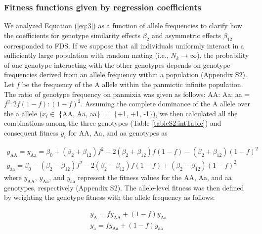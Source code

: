 \documentclass[12pt,]{article}
\begin{document}
\subsubsection{Fitness functions given by regression coefficients}
We analyzed Equation (\ref{eq:3}) as a function of allele frequencies to clarify how the coefficients for genotype similarity effects $\beta_2$ and asymmetric effects $\beta_{12}$ corresponded to FDS. If we suppose that all individuals uniformly interact in a sufficiently large population with random mating (i.e., $N_k \to \infty$), the probability of one genotype interacting with the other genotypes depends on genotype frequencies derived from an allele frequency within a population (Appendix S2). Let $f$ be the frequency of the A allele within the panmictic infinite population. The ratio of genotype frequency on panmixia was given as follows: AA: Aa: aa = $f^2:2f(1-f):(1-f)^2$. Assuming the complete dominance of the A allele over the a allele ($x_i \in$ \{AA, Aa, aa\} $=$ \{+1, +1, -1\}), we then calculated all the combinations among the three genotypes (Table \ref{tableS2:intTable}) and consequent fitness $y_i$ for AA, Aa, and aa genotypes as

\begin{subequations}
\begin{align}
y_\mathrm{AA} = y_\mathrm{Aa} = \beta_0 + (\beta_2 + \beta_{12})f^2 + 2(\beta_2 + \beta_{12}) f(1-f) - (\beta_2 + \beta_{12})(1-f)^2 \label{eq:4a} \\
y_\mathrm{aa} = \beta_0 - (\beta_2 - \beta_{12}) f^2 - 2(\beta_2 - \beta_{12})f(1-f) + (\beta_2 - \beta_{12})(1-f)^2 \label{eq:4b}
\end{align}
\end{subequations}
\noindent
where $y_\mathrm{AA}$, $y_\mathrm{Aa}$, and $y_\mathrm{aa}$ represent the fitness values for the AA, Aa, and aa genotypes, respectively (Appendix S2). The allele-level fitness was then defined by weighting the genotype fitness with the allele frequency as follows:

\begin{subequations}
\begin{align}
y_\mathrm{A} = f y_\mathrm{AA} + (1 - f) y_\mathrm{Aa} \label{eq:5a} \\
y_\mathrm{a} = f y_\mathrm{Aa} + (1 - f) y_\mathrm{aa} \label{eq:5b}
\end{align}
\end{subequations}
\end{document}
